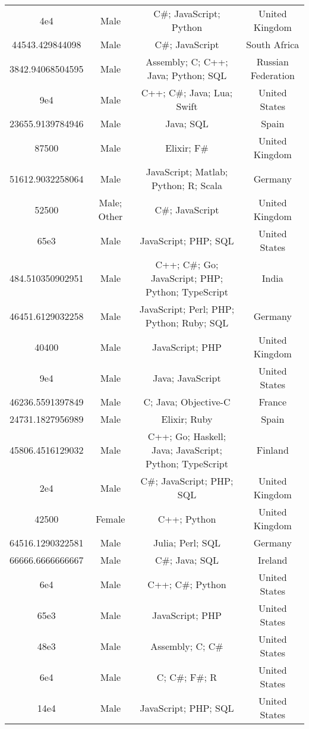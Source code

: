 \begin{center}
\begin{tabular}{ |c|c|c|c| }
4e4  &  Male  &  C\#; JavaScript; Python  &  United Kingdom  \\ 
44543.429844098  &  Male  &  C\#; JavaScript  &  South Africa  \\ 
3842.94068504595  &  Male  &  Assembly; C; C++; Java; Python; SQL  &  Russian Federation  \\ 
9e4  &  Male  &  C++; C\#; Java; Lua; Swift  &  United States  \\ 
23655.9139784946  &  Male  &  Java; SQL  &  Spain  \\ 
87500  &  Male  &  Elixir; F\#  &  United Kingdom  \\ 
51612.9032258064  &  Male  &  JavaScript; Matlab; Python; R; Scala  &  Germany  \\ 
52500  &  Male; Other  &  C\#; JavaScript  &  United Kingdom  \\ 
65e3  &  Male  &  JavaScript; PHP; SQL  &  United States  \\ 
484.510350902951  &  Male  &  C++; C\#; Go; JavaScript; PHP; Python; TypeScript  &  India  \\ 
46451.6129032258  &  Male  &  JavaScript; Perl; PHP; Python; Ruby; SQL  &  Germany  \\ 
40400  &  Male  &  JavaScript; PHP  &  United Kingdom  \\ 
9e4  &  Male  &  Java; JavaScript  &  United States  \\ 
46236.5591397849  &  Male  &  C; Java; Objective-C  &  France  \\ 
24731.1827956989  &  Male  &  Elixir; Ruby  &  Spain  \\ 
45806.4516129032  &  Male  &  C++; Go; Haskell; Java; JavaScript; Python; TypeScript  &  Finland  \\ 
2e4  &  Male  &  C\#; JavaScript; PHP; SQL  &  United Kingdom  \\ 
42500  &  Female  &  C++; Python  &  United Kingdom  \\ 
64516.1290322581  &  Male  &  Julia; Perl; SQL  &  Germany  \\ 
66666.6666666667  &  Male  &  C\#; Java; SQL  &  Ireland  \\ 
6e4  &  Male  &  C++; C\#; Python  &  United States  \\ 
65e3  &  Male  &  JavaScript; PHP  &  United States  \\ 
48e3  &  Male  &  Assembly; C; C\#  &  United States  \\ 
6e4  &  Male  &  C; C\#; F\#; R  &  United States  \\ 
14e4  &  Male  &  JavaScript; PHP; SQL  &  United States  \\ 

\end{tabular}
\end{center}

